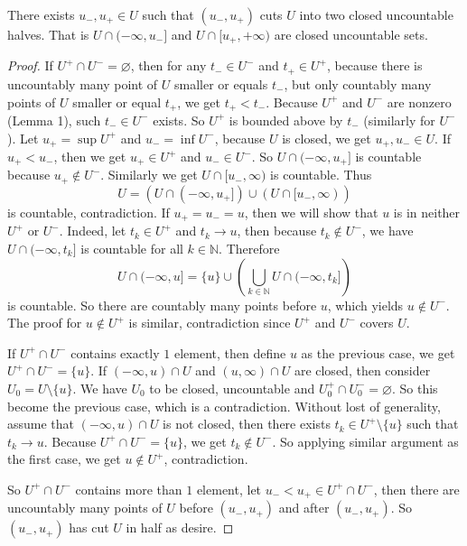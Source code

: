 \documentclass[12pt, a4paper]{article}
\theoremstyle{plain}
\newcommand{\N}{\mathbb{N}}
\begin{document}
\begin{lemma}{2}
There exists $u_-,u_+\in U$ such that $(u_-,u_+)$ cuts $U$ into two closed uncountable halves. That is $U\cap (-\infty,u_-]$ and $U\cap [u_+,+\infty)$ are closed uncountable sets.
\end{lemma}
	\begin{proof}
	If $U^+\cap U^-=\varnothing$, then for any $t_-\in U^-$ and $t_+\in U^+$, because there is uncountably many point of $U$ smaller or equals $t_-$, but only countably many points of $U$ smaller or equal $t_+$, we get $t_+<t_-$. Because $U^+$ and $U^-$ are nonzero (Lemma 1), such $t_-\in U^-$ exists. So $U^+$ is bounded above by $t_-$ (similarly for $U^-$). Let $u_+ = \sup U^+$ and $u_- = \inf U^-$, because $U$ is closed, we get $u_+,u_-\in U$. If $u_+<u_-$, then we get $u_+\in U^+$ and $u_-\in U^-$. So $U\cap (-\infty, u_+]$ is countable because $u_+\notin U^-$. Similarly we get $U\cap [u_-,\infty)$ is countable. Thus
	\[
	U = (U\cap (-\infty, u_+])\cup (U\cap [u_-,\infty))
	\]    
	is countable, contradiction. If $u_+ = u_-=u$, then we will show that $u$ is in neither $U^+$ or $U^-$. Indeed, let $t_k\in U^+$ and $t_k\rightarrow u$, then because $t_k\notin U^-$, we have $U\cap (-\infty,t_k]$ is countable for all $k\in\N$. Therefore
	\[
	U\cap (-\infty,u] = \{u\}\cup \left(\bigcup_{k\in \N} U\cap (-\infty,t_k] \right)
	\]
	is countable. So there are countably many points before $u$, which yields $u\notin U^-$. The proof for $u\notin U^+$ is similar, contradiction since $U^+$ and $U^-$ covers $U$.
	
	If $U^+\cap U^-$ contains exactly $1$ element, then define $u$ as the previous case, we get $U^+\cap U^-=\{u\}$. If $(-\infty,u)\cap U$ and $(u,\infty)\cap U$ are closed, then consider $U_0 = U\setminus\{u\}$. We have $U_0$ to be closed, uncountable and $U_0^+\cap U_0^-=\varnothing$. So this become the previous case, which is a contradiction. Without lost of generality, assume that $(-\infty,u)\cap U$ is not closed, then there exists $t_k\in U^+\setminus\{u\}$ such that $t_k\rightarrow u$. Because $U^+\cap U^-=\{u\}$, we get $t_k\notin U^-$. So applying similar argument as the first case, we get $u\notin U^+$, contradiction.
	
	So $U^+\cap U^-$ contains more than $1$ element, let $u_-<u_+\in U^+\cap U^-$, then there are uncountably many points of $U$ before $(u_-,u_+)$ and after $(u_-,u_+)$. So $(u_-,u_+)$ has cut $U$ in half as desire.
	\end{proof}
\end{document}
